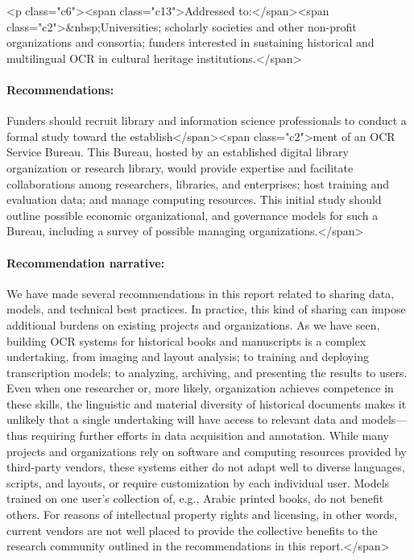 \documentclass[twoside,11pt]{report}
\begin{document}
<p class="c6"><span class="c13">Addressed to:</span><span class="c2">&nbsp;Universities; scholarly societies and other non-profit organizations and consortia; funders interested in sustaining historical and multilingual OCR in cultural heritage institutions.</span>

\paragraph{Recommendations:} Funders should recruit library and information science professionals to conduct a formal study toward the establish</span><span class="c2">ment of an OCR Service Bureau. This Bureau, hosted by an established digital library organization or research library, would provide expertise and facilitate collaborations among researchers, libraries, and enterprises; host training and evaluation data; and manage computing resources. This initial study should outline possible economic organizational, and governance models for such a Bureau, including a survey of possible managing organizations.</span>

\paragraph{Recommendation narrative:}

We have made several recommendations in this report related to sharing data, models, and technical best practices. In practice, this kind of sharing can impose additional burdens on existing projects and organizations. As we have seen, building OCR systems for historical books and manuscripts is a complex undertaking, from imaging and layout analysis; to training and deploying transcription models; to analyzing, archiving, and presenting the results to users. Even when one researcher or, more likely, organization achieves competence in these skills, the linguistic and material diversity of historical documents makes it unlikely that a single undertaking will have access to relevant data and models---thus requiring further efforts in data acquisition and annotation. While many projects and organizations rely on software and computing resources provided by third-party vendors, these systems either do not adapt well to diverse languages, scripts, and layouts, or require customization by each individual user. Models trained on one user's collection of, e.g., Arabic printed books, do not benefit others. For reasons of intellectual property rights and licensing, in other words, current vendors are not well placed to provide the collective benefits to the research community outlined in the recommendations in this report.</span>
\end{document}
